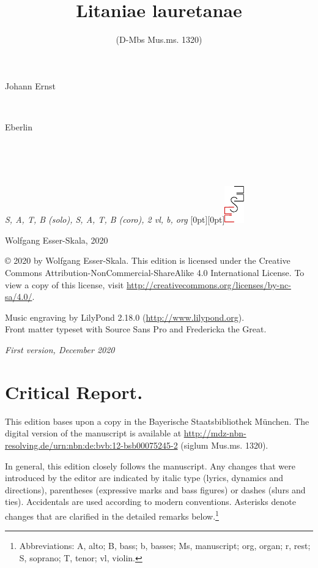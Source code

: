 \documentclass[parskip=full]{scrreprt}
\makeatletter
\DeclareRobustCommand{\sbseries}{\fontseries{sb}\selectfont}
\newcommand\fancytitlehead{
	\headingfont%
	\fontsize{80}{80}\selectfont\textcolor{black!80}{\@ifundefined{@shortname}{\@lastname}{\@shortname}.}\\[15pt]%
	\fontsize{60}{60}\selectfont\@ifundefined{@shorttitle}{\@title}{\@shorttitle}.%
}
\def\firstname#1{\def\@firstname{#1}}
\def\lastname#1{\def\@lastname{#1}}
\def\shorttitle#1{\def\@shorttitle{#1}}
\def\instrumentation#1{\def\@instrumentation{#1}}
\def\maketitle{%
\begin{titlepage}%
	\Large%
	{\@titlehead}%
	\vfill%
	{\strut\@firstname}\\%
	{\sbseries\color{oldred}\strut\@lastname}\\%
	{\strut\@namesuffix}%
	\vfill%
	{\sbseries\@title}\\%
	{\@subtitle}\\[\baselineskip]%
	{\itshape\@instrumentation}%
	\vfill%
	{\itshape\@parts}\hspace*{\fill}\raisebox{0pt}[0pt][0pt]{\includegraphics{ees_logo}}%
\end{titlepage}%
}
\newif\ifprintreport\printreportfalse
\makeatother
\begin{document}
\frenchspacing

\titlehead{\fancytitlehead}
\firstname{Johann Ernst}
\lastname{Eberlin}
\title{Litaniae lauretanae}
\shorttitle{Lit. lauretanae}
\subtitle{(D-Mbs Mus.ms. 1320)}
\instrumentation{S, A, T, B (solo), S, A, T, B (coro), 2 vl, b, org}
\maketitle


\thispagestyle{empty}

\vspace*{\fill}

\hspace*{1em}Wolfgang Esser-Skala, 2020

© 2020 by Wolfgang Esser-Skala. This edition is licensed under the Creative Commons Attribution-NonCommercial-ShareAlike 4.0 International License. To view a copy of this license, visit \url{http://creativecommons.org/licenses/by-nc-sa/4.0/}. 

Music engraving by LilyPond 2.18.0 (\url{http://www.lilypond.org}).\\
Front matter typeset with Source Sans Pro and Fredericka the Great.

\textit{First version, December 2020}

\vspace*{2cm}

\ifprintreport
\chapter*{Critical Report.}

This edition bases upon a copy in the Bayerische Staatsbibliothek München. The digital version of the manuscript is available at \url{http://mdz-nbn-resolving.de/urn:nbn:de:bvb:12-bsb00075245-2} (siglum Mus.ms. 1320).

In general, this edition closely follows the manuscript. Any changes that were introduced by the editor are indicated by italic type (lyrics, dynamics and directions), parentheses (expressive marks and bass figures) or dashes (slurs and ties). Accidentals are used according to modern conventions. Asterisks denote changes that are clarified in the detailed remarks below.\footnote{Abbreviations: A, alto; B, bass; b, basses; Ms, manuscript; org, organ; r, rest; S, soprano; T, tenor; vl, violin.}
\end{document}
